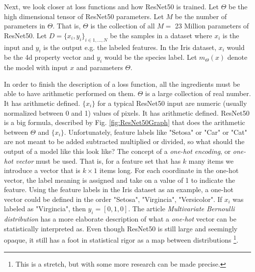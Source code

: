 Next, we look closer at loss functions and how ResNet50 is trained. Let $\Theta$ be the high dimensional tensor of ResNet50 parameters. Let $M$ be the number of parameters in $\Theta$. That is, $\Theta$ is the collection of all $M=$ 23 Million parameters of ResNet50. Let $D=\{x_i, y_i\}_{i\in1,...,N}$ be the samples in a dataset where $x_i$ is the input and $y_i$ is the output e.g. the labeled features. In the Iris dataset, $x_i$ would be the 4d property vector and $y_i$ would be the species label. Let $m_\Theta(x)$ denote the model with input $x$ and parameters $\Theta$.

In order to finish the description of a loss function, all the ingredients must be able to have arithmetic performed on them. $\Theta$ is a large collection of real number. It has arithmetic defined. $\{x_i\}$ for a typical ResNet50 input are numeric (usually normalized between 0 and 1) values of pixels. It has arithmetic defined. ResNet50 is a big formula, described by Fig. \ref{fig:ResNet50Graph} that does the arithmetic between $\Theta$ and $\{x_i\}$. Unfortunately, feature labels like "Setosa" or "Car" or "Cat" are not meant to be added subtracted multiplied or divided, so what should the output of a model like this look like? The concept of a \emph{one-hot encoding}, or \emph{one-hot vector} must be used. That is, for a feature set that has $k$ many items we introduce a vector that is $k\times 1$ items long. For each coordinate in the one-hot vector, the label meaning is assigned and take on a value of 1 to indicate the feature. Using the feature labels in the Iris dataset as an example, a one-hot vector could be defined in the order "Setosa", "Virgincia", "Versicolor". If $x_i$ was labeled as "Virgincia", then  $y_i = [ 0, 1, 0 ]$. The article \emph{Multivariate Bernoulli distribution} \cite{Dai:MVBer} has a more elaborate description of what a \emph{one-hot} vector can be statistically interpreted as. Even though ResNet50 is still large and seemingly opaque, it still has a foot in statistical rigor as a map between distributions \footnote{This is a stretch, but with some more research can be made precise.}. 

